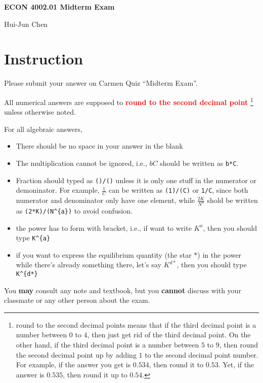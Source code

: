 \documentclass[14pt]{extarticle}
\newcommand{\red}[1]{\textcolor{red}{#1}}
\newcommand{\showAns}{\setboolean{showAns}{true}}
\begin{document}
\centerline{\huge\bf ECON 4002.01 Midterm Exam}
\smallskip
\centerline{\LARGE Hui-Jun Chen}

\medskip

\showAns

\section*{Instruction}
\label{sec:Instruction}
Please submit your answer on Carmen Quiz ``Midterm Exam''.

All numerical answers are supposed to \red{\textbf{round to the second decimal point}}%
\footnote{round to the second decimal points means that if the third decimal point is a number between $ 0 $ to $ 4 $, then just get rid of the third decimal point. On the other hand, if the third decimal point is a number between $ 5 $ to $ 9 $, then round the second decimal point up by adding $ 1 $ to the second decimal point number. For example, if the answer you get is $ 0.534 $, then round it to $ 0.53 $. Yet, if the answer is $ 0.535 $, then round it up to $ 0.54 $.}
unless otherwise noted.

For all algebraic answers,
\begin{itemize}
    \item There should be no space in your answer in the blank
    \item The multiplication cannot be ignored, i.e., $ bC $ should be written as \verb|b*C|.
    \item Fraction should typed as \verb|()/()| unless it is only one stuff in the numerator or demoninator.
            For example, $ \frac{1}{C} $ can be written as \verb|(1)/(C)| or \verb|1/C|, since both numerator and denominator only have one element, while $ \frac{2K}{N^{a}} $ shold be written as \verb|(2*K)/(N^{a})| to avoid confusion.
    \item the power has to form with bracket, i.e., if want to write $ K^{a} $, then you should type \verb|K^{a}|
    \item if you want to express the equilibrium quantity (the star $ * $) in the power while there's already something there, let's say $ K^{d*} $, then you should type \verb|K^{d*}|
\end{itemize}

You \textbf{may} consult any note and textbook, but you \textbf{cannot} discuss with your classmate or any other person about the exam.
\end{document}
